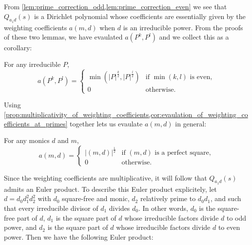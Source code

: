 \documentclass[12pt,reqno,oneside]{amsart}
\begin{document}
    From \cref{lem:prime_correction_odd,lem:prime_correction_even} we see that $Q_{a_{1}d}(s)$ is a Dirichlet polynomial whose coefficients are essentially given by the weighting coefficients $a(m,d)$ when $d$ is an irreducible power. From the proofs of these two lemmas, we have evaulated $a(P^{k},P^{l})$ and we collect this as a corollary:

    \begin{corollary}\label{cor:evaulation_of_weighting_coefficients_at_primes}
        For any irreducible $P$,
        \[
            a(P^{k},P^{l}) = \begin{cases} \min\left(|P|^{\frac{k}{2}},|P|^{\frac{l}{2}}\right) & \text{if $\min(k,l)$ is even}, \\ 0 & \text{otherwise}. \end{cases}
        \]
    \end{corollary}

    Using \cref{prop:multiplicativity_of_weighting_coefficients,cor:evaulation_of_weighting_coefficients_at_primes} together lets us evaulate $a(m,d)$ in general:

    \begin{corollary}\label{cor:evaulation_of_weighting_coefficients_in_general}
        For any monics $d$ and $m$,
        \[
            a(m,d) = \begin{cases} |(m,d)|^{\frac{1}{2}} & \text{if $(m,d)$ is a perfect square}, \\ 0 & \text{otherwise}. \end{cases}
         \]
    \end{corollary}
    
    Since the weighting coefficients are multiplicative, it will follow that $Q_{a_{1}d}(s)$ admits an Euler product. To describe this Euler product explicitely, let $d = d_{0}d_{1}^{2}d_{2}^{2}$ with $d_{0}$ square-free and monic, $d_{2}$ relatively prime to $d_{0}d_{1}$, and such that every irreducible divisor of $d_{1}$ divides $d_{0}$. In other words, $d_{0}$ is the square-free part of $d$, $d_{1}$ is the square part of $d$ whose irreducible factors divide $d$ to odd power, and $d_{2}$ is the square part of $d$ whose irreducible factors divide $d$ to even power. Then we have the following Euler product:
\end{document}
